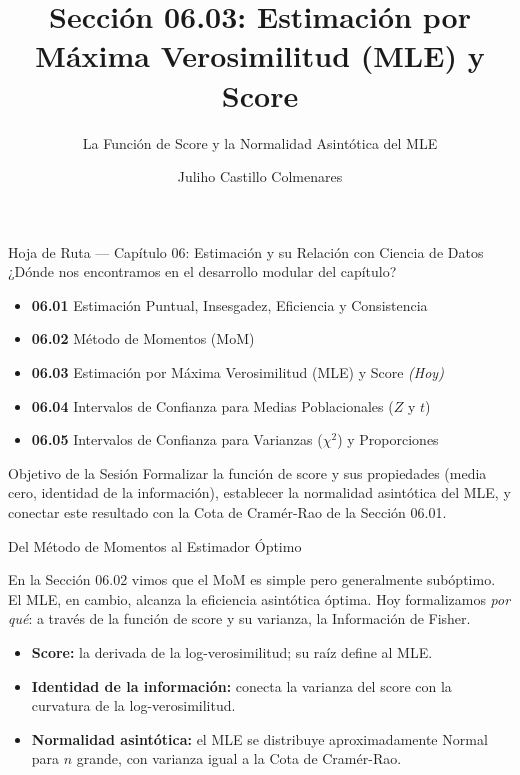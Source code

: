 \documentclass[10pt, aspectratio=169]{beamer}
\title[MLE y Score]{Sección 06.03: Estimación por Máxima Verosimilitud (MLE) y Score}
\subtitle{La Función de Score y la Normalidad Asintótica del MLE}
\author[J. Castillo Colmenares]{Juliho Castillo Colmenares}
\institute{Tecnológico de Monterrey}
\date{\vspace{-1.2cm}}
\begin{document}
\begin{frame}[plain]
  \titlepage
\end{frame}

\begin{frame}{Hoja de Ruta --- Capítulo 06: Estimación y su Relación con Ciencia de Datos}
  \footnotesize
  ¿Dónde nos encontramos en el desarrollo modular del capítulo? \pause
  \begin{itemize}\itemsep=0.08em
    \item \textbf{06.01} Estimación Puntual, Insesgadez, Eficiencia y Consistencia \pause
    \item \textbf{06.02} Método de Momentos (MoM) \pause
    \item \textbf{06.03} Estimación por Máxima Verosimilitud (MLE) y Score \emph{(Hoy)} \pause
    \item \textbf{06.04} Intervalos de Confianza para Medias Poblacionales ($Z$ y $t$) \pause
    \item \textbf{06.05} Intervalos de Confianza para Varianzas ($\chi^2$) y Proporciones
  \end{itemize}
  \vspace{-0.05cm}
  \begin{block}{Objetivo de la Sesión}
    Formalizar la función de score y sus propiedades (media cero, identidad de la información), establecer la normalidad asintótica del MLE, y conectar este resultado con la Cota de Cramér-Rao de la Sección 06.01.
  \end{block}
\end{frame}

\begin{frame}{Del Método de Momentos al Estimador Óptimo}
  \footnotesize
  \begin{motivacion}
    En la Sección 06.02 vimos que el MoM es simple pero generalmente subóptimo. El MLE, en cambio, alcanza la eficiencia asintótica óptima. Hoy formalizamos \emph{por qué}: a través de la función de score y su varianza, la Información de Fisher.
  \end{motivacion}

  \vspace{0.15cm}
  \pause
  \begin{itemize}\itemsep=0.1cm
    \item \textbf{Score:} la derivada de la log-verosimilitud; su raíz define al MLE. \pause
    \item \textbf{Identidad de la información:} conecta la varianza del score con la curvatura de la log-verosimilitud. \pause
    \item \textbf{Normalidad asintótica:} el MLE se distribuye aproximadamente Normal para $n$ grande, con varianza igual a la Cota de Cramér-Rao.
  \end{itemize}
\end{frame}
\end{document}
